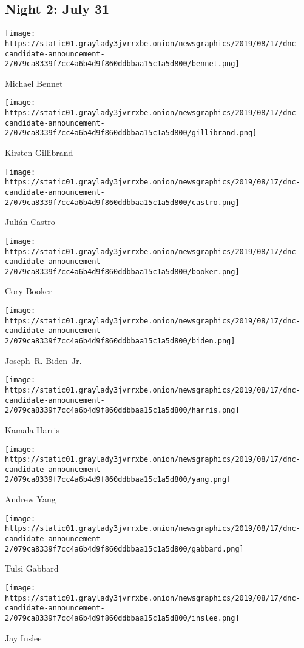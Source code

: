 \hypertarget{night-2-july-31}{%
\subsection{Night 2: July 31}\label{night-2-july-31}}

\texttt{[image: https://static01.graylady3jvrrxbe.onion/newsgraphics/2019/08/17/dnc-candidate-announcement-2/079ca8339f7cc4a6b4d9f860ddbbaa15c1a5d800/bennet.png]}

Michael Bennet

\texttt{[image: https://static01.graylady3jvrrxbe.onion/newsgraphics/2019/08/17/dnc-candidate-announcement-2/079ca8339f7cc4a6b4d9f860ddbbaa15c1a5d800/gillibrand.png]}

Kirsten Gillibrand

\texttt{[image: https://static01.graylady3jvrrxbe.onion/newsgraphics/2019/08/17/dnc-candidate-announcement-2/079ca8339f7cc4a6b4d9f860ddbbaa15c1a5d800/castro.png]}

Julián Castro

\texttt{[image: https://static01.graylady3jvrrxbe.onion/newsgraphics/2019/08/17/dnc-candidate-announcement-2/079ca8339f7cc4a6b4d9f860ddbbaa15c1a5d800/booker.png]}

Cory Booker

\texttt{[image: https://static01.graylady3jvrrxbe.onion/newsgraphics/2019/08/17/dnc-candidate-announcement-2/079ca8339f7cc4a6b4d9f860ddbbaa15c1a5d800/biden.png]}

Joseph~R. Biden~Jr.

\texttt{[image: https://static01.graylady3jvrrxbe.onion/newsgraphics/2019/08/17/dnc-candidate-announcement-2/079ca8339f7cc4a6b4d9f860ddbbaa15c1a5d800/harris.png]}

Kamala Harris

\texttt{[image: https://static01.graylady3jvrrxbe.onion/newsgraphics/2019/08/17/dnc-candidate-announcement-2/079ca8339f7cc4a6b4d9f860ddbbaa15c1a5d800/yang.png]}

Andrew Yang

\texttt{[image: https://static01.graylady3jvrrxbe.onion/newsgraphics/2019/08/17/dnc-candidate-announcement-2/079ca8339f7cc4a6b4d9f860ddbbaa15c1a5d800/gabbard.png]}

Tulsi Gabbard

\texttt{[image: https://static01.graylady3jvrrxbe.onion/newsgraphics/2019/08/17/dnc-candidate-announcement-2/079ca8339f7cc4a6b4d9f860ddbbaa15c1a5d800/inslee.png]}

Jay Inslee

